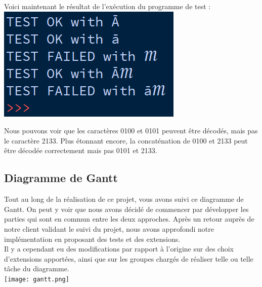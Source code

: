 \documentclass[a4paper,12pt]{article}
\begin{document}
\noindent Voici maintenant le résultat de l'exécution du programme de test :\\
\noindent\includegraphics[width=.3\textwidth]{test_charactères.png}

\noindent Nous pouvons voir que les caractères 0100 et 0101 peuvent être décodés, mais pas le caractère 2133. Plus étonnant encore, la concaténation de 0100 et 2133 peut être décodée correctement mais pas 0101 et 2133.

\newpage

\subsection{Diagramme de Gantt}
\noindent Tout au long de la réalisation de ce projet, vous avons suivi ce diagramme de Gantt. On peut y voir que nous avons décidé de commencer par développer les parties qui sont en commun entre les deux approches. Après un retour auprès de notre client validant le suivi du projet, nous avons approfondi notre implémentation en proposant des tests et des extensions.\\ 
Il y a cependant eu des modifications par rapport à l'origine sur des choix d'extensions apportées, ainsi que sur les groupes chargés de réaliser telle ou telle tâche du diagramme.\\ 

\noindent\texttt{[image: gantt.png]}

\newpage
\end{document}
